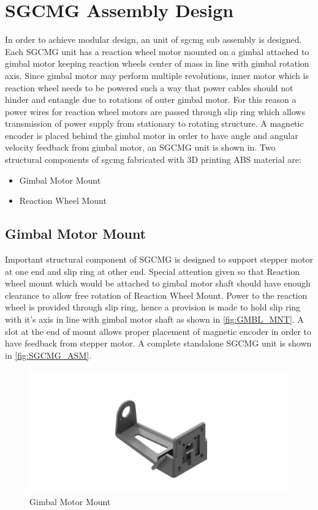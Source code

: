 \section{SGCMG Assembly Design}
In order to achieve modular design, an unit of \acrlong{sgcmg} sub assembly is designed. Each SGCMG unit has a reaction wheel motor mounted on a gimbal attached to gimbal motor keeping reaction wheels center of mass in line with gimbal rotation axis. Since gimbal motor may perform multiple revolutions, inner motor which is reaction wheel needs to be powered such a way that power cables should not hinder and entangle due to rotations of outer gimbal motor. For this reason a power wires for reaction wheel motors are passed through slip ring which allows transmission of power supply from stationary to rotating structure. A magnetic encoder is placed behind the gimbal motor in order to have angle and angular velocity feedback from gimbal motor, an SGCMG unit is shown in. Two structural components of \acrshort{sgcmg} fabricated with 3D printing ABS material are:
\begin{itemize}
    \item Gimbal Motor Mount
    \item Reaction Wheel Mount
\end{itemize}
\subsection{Gimbal Motor Mount}
Important structural component of SGCMG is designed to support stepper motor at one end and slip ring at other end. Special attention given so that Reaction wheel mount which would be attached to gimbal motor shaft should have enough clearance to allow free rotation of Reaction Wheel Mount. Power to the reaction wheel is provided through slip ring, hence a provision is made to hold slip ring with it's axis in line with gimbal motor shaft as shown in \autoref{fig:GMBL_MNT}. A slot at the end of mount allows proper placement of magnetic encoder in order to have feedback from stepper motor. A complete standalone SGCMG unit is shown in \autoref{fig:SGCMG_ASM}.

\begin{figure}[ht]
    \centering
    \includegraphics[width=\textwidth]{figures/Assembly/STP_MOUNT.pdf}
    \caption{Gimbal Motor Mount }
    \label{fig:GMBL_MNT}
\end{figure}

